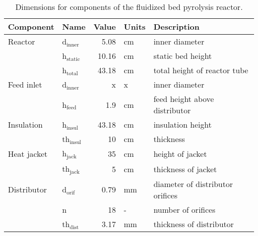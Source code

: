 \begin{table}[H]
    \centering
    \caption{Dimensions for components of the fluidized bed pyrolysis reactor.}
    \label{tab:dimensions}
    \begin{tabular}{llrll}
        \toprule
        Component & Name & Value & Units & Description \\
        \midrule
        Reactor
            & d$_\textrm{inner}$ & 5.08 & cm & inner diameter \\
            & h$_\textrm{static}$ & 10.16 & cm & static bed height \\
            & h$_\textrm{total}$ & 43.18 & cm & total height of reactor tube \\
        Feed inlet
            & d$_\textrm{inner}$ & x & x & inner diameter \\
            & h$_\textrm{feed}$ & 1.9 & cm & feed height above distributor \\
        Insulation
            & h$_\textrm{insul}$ & 43.18 & cm & insulation height \\
            & th$_\textrm{insul}$ & 10 & cm & thickness \\
        Heat jacket
            & h$_\textrm{jack}$ & 35 & cm & height of jacket \\
            & th$_\textrm{jack}$ & 5 & cm & thickness of jacket \\
        Distributor
            & d$_\textrm{orif}$ & 0.79 & mm & diameter of distributor orifices \\
            & n & 18 & - &number of orifices \\
            & th$_\textrm{dist}$ & 3.17 & mm & thickness of distributor \\
        \bottomrule
    \end{tabular}
\end{table}

